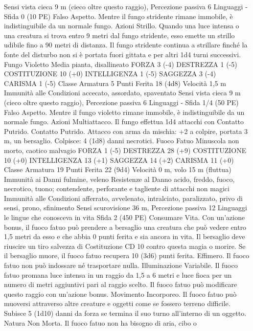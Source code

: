 \begin{multicols}{2}
Sensi vista cieca 9 m (cieco oltre questo raggio), Percezione
passiva 6
Linguaggi -
Sfida 0 (10 PE)
Falso Aspetto. Mentre il fungo stridente rimane immobile, è
indistinguibile da un normale fungo.
Azioni
Strillo. Quando una luce intensa o una creatura si trova entro 9
metri dal fungo stridente, esso emette un strillo udibile fino a 90
metri di distanza. Il fungo stridente continua a strillare finché la
fonte del disturbo non si è portata fuori gittata e per altri 1d4
turni successivi.
Fungo Violetto
Media pianta, disallineato
FORZA 3 (-4)
DESTREZZA 1 (-5)
COSTITUZIONE 10 (+0)
INTELLIGENZA 1 (-5)
SAGGEZZA 3 (-4)
CARISMA 1 (-5)
Classe Armatura 5
Punti Ferita 18 (4d8)
Velocità 1,5 m
Immunità alle Condizioni accecato, assordato, spaventato
Sensi vista cieca 9 m (cieco oltre questo raggio), Percezione
passiva 6
Linguaggi -
Sfida 1/4 (50 PE)
Falso Aspetto. Mentre il fungo violetto rimane immobile, è
indistinguibile da un normale fungo.
Azioni
Multiattacco. Il fungo effettua 1d4 attacchi con Contatto Putrido.
Contatto Putrido. Attacco con arma da mischia: +2 a colpire,
portata 3 m, un bersaglio.
Colpisce: 4 (1d8) danni necrotici.
Fuoco Fatuo
Minuscola non morto, caotico malvagio
FORZA 1 (-5)
DESTREZZA 28 (+9)
COSTITUZIONE 10 (+0)
INTELLIGENZA 13 (+1)
SAGGEZZA 14 (+2)
CARISMA 11 (+0)
Classe Armatura 19
Punti Ferita 22 (9d4)
Velocità 0 m, volo 15 m (fluttua)
Immunità ai Danni fulmine, veleno
Resistenze al Danno acido, freddo, fuoco, necrotico, tuono;
contendente, perforante e tagliente di attacchi non magici
Immunità alle Condizioni afferrato, avvelenato, intralciato,
paralizzato, privo di sensi, prono, sfinimento
Sensi scurovisione 36 m, Percezione passiva 12
Linguaggi le lingue che conosceva in vita
Sfida 2 (450 PE)
Consumare Vita. Con un’azione bonus, il fuoco fatuo può
prendere a bersaglio una creatura che può vedere entro 1,5 metri
da esso e che abbia 0 punti ferita e sia ancora in vita. Il bersaglio
deve riuscire un tiro salvezza di Costituzione CD 10 contro
questa magia o morire. Se il bersaglio muore, il fuoco fatuo
recupera 10 (3d6) punti ferita.
Effimero. Il fuoco fatuo non può indossare né trasportare nulla.
Illuminazione Variabile. Il fuoco fatuo promana luce intensa in
un raggio da 1,5 a 6 metri e luce fioca per un numero di metri
aggiuntivi pari al raggio scelto. Il fuoco fatuo può modificare
questo raggio con un’azione bonus.
Movimento Incorporeo. Il fuoco fatuo può muoversi attraverso
altre creature e oggetti come se fossero terreno difficile. Subisce
5 (1d10) danni da forza se termina il suo turno all’interno di un
oggetto.
Natura Non Morta. Il fuoco fatuo non ha bisogno di aria, cibo o

\end{multicols}
